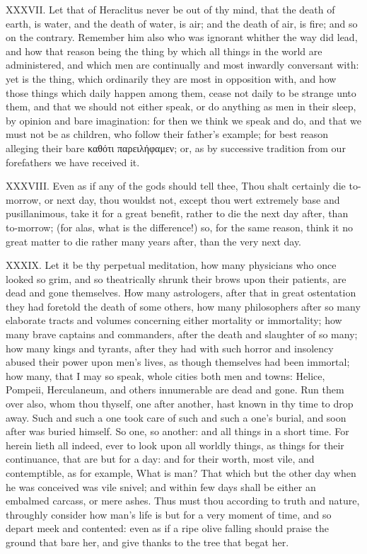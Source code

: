 XXXVII. Let that of Heraclitus
never be out of thy mind, that the death of earth, is water, and the death of
water, is air; and the death of air, is fire; and so on the contrary. Remember
him also who was ignorant whither the way did lead, and how that reason being
the thing by which all things in the world are administered, and which men are
continually and most inwardly conversant with: yet is the thing, which
ordinarily they are most in opposition with, and how those things which daily
happen among them, cease not daily to be strange unto them, and that we should
not either speak, or do anything as men in their sleep, by opinion and bare
imagination: for then we think we speak and do, and that we must not be as
children, who follow their father's example; for best reason alleging their
bare καθότι
παρειλήφαμεν; or,
as by successive tradition from our forefathers we have received it.

XXXVIII. Even as if any of the gods should tell thee, Thou shalt
certainly die to-morrow, or next day, thou wouldst not, except thou wert
extremely base and pusillanimous, take it for a great benefit, rather to
die the next day after, than to-morrow; (for alas, what is the
difference!) so, for the same reason, think it no great matter to die
rather many years after, than the very next day.

XXXIX. Let it be thy perpetual meditation, how many physicians who
once looked so grim, and so theatrically shrunk their brows upon their
patients, are dead and gone themselves. How many astrologers, after that
in great ostentation they had foretold the death of some others, how many
philosophers after so many elaborate tracts and volumes concerning either
mortality or immortality; how many brave captains and commanders, after
the death and slaughter of so many; how many kings and tyrants, after they
had with such horror and insolency abused their power upon men's lives, as
though themselves had been immortal; how many, that I may so speak, whole
cities both men and towns: Helice, Pompeii, Herculaneum, and others
innumerable are dead and gone. Run them over also, whom thou thyself, one
after another, hast known in thy time to drop away. Such and such a one
took care of such and such a one's burial, and soon after was buried
himself. So one, so another: and all things in a short time. For herein
lieth all indeed, ever to look upon all worldly things, as things for
their continuance, that are but for a day: and for their worth, most vile,
and contemptible, as for example, What is man? That which but the other
day when he was conceived was vile snivel; and within few days shall be
either an embalmed carcass, or mere ashes. Thus must thou according to
truth and nature, throughly consider how man's life is but for a very
moment of time, and so depart meek and contented: even as if a ripe olive
falling should praise the ground that bare her, and give thanks to the
tree that begat her.

